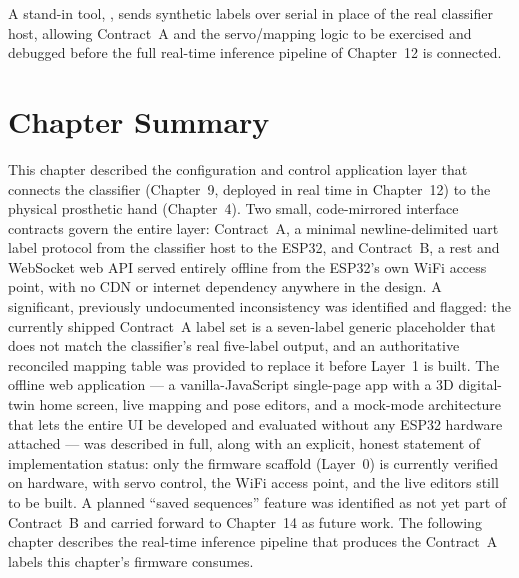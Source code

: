 A stand-in tool, , sends synthetic labels
over serial in place of the real classifier host, allowing Contract~A
and the servo/mapping logic to be exercised and debugged before
the full real-time inference pipeline of Chapter~12 is connected.

\section{Chapter Summary}
\label{sec:app_summary}

This chapter described the configuration and control application
layer that connects the classifier (Chapter~9, deployed in
real time in Chapter~12) to the physical prosthetic hand
(Chapter~4). Two small, code-mirrored interface contracts govern
the entire layer: Contract~A, a minimal newline-delimited
\acrshort{uart} label protocol from the classifier host to the
ESP32, and Contract~B, a \acrshort{rest} and WebSocket web API
served entirely offline from the ESP32's own WiFi access point,
with no CDN or internet dependency anywhere in the design. A
significant, previously undocumented inconsistency was identified
and flagged: the currently shipped Contract~A label set is a
seven-label generic placeholder that does not match the classifier's
real five-label output, and an authoritative reconciled mapping
table was provided to replace it before Layer~1 is built. The
offline web application --- a vanilla-JavaScript single-page app
with a 3D digital-twin home screen, live mapping and pose editors,
and a mock-mode architecture that lets the entire UI be developed
and evaluated without any ESP32 hardware attached --- was described
in full, along with an explicit, honest statement of implementation
status: only the firmware scaffold (Layer~0) is currently verified
on hardware, with servo control, the WiFi access point, and the
live editors still to be built. A planned ``saved sequences''
feature was identified as not yet part of Contract~B and carried
forward to Chapter~14 as future work. The following chapter
describes the real-time inference pipeline that produces the
Contract~A labels this chapter's firmware consumes.